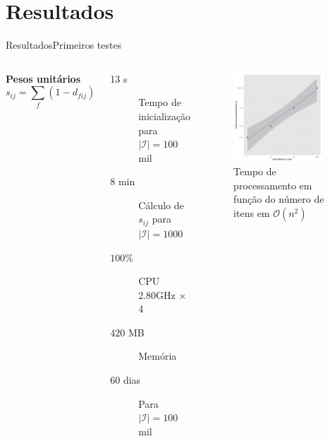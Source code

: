 \section[Resultados]{Resultados}

\begin{frame}{Resultados}{Primeiros testes}
\begin{columns}[c]
\textbf{Pesos unitários}
$$
    s_{ij} = \sum_{f}{\left(1-d_{fij}\right)}
$$
\begin{description}
	\item[13 s] Tempo de inicialização para $\left|\mathcal{I}\right| = 100$ mil
	\item[8 min] Cálculo de $s_{ij}$ para $\left|\mathcal{I}\right| = 1000$
	\item[$100 \%$] CPU \\ 2.80GHz $\times$ 4
	\item[$420$ MB] Memória 
	\item[]
	\item[60 dias] Para $\left|\mathcal{I}\right| = 100$  mil
\end{description}	
\begin{figure}[ht]
    \begin{center}
    \includegraphics[width=0.9\textwidth]{img/ixt}
    \end{center}
\caption{Tempo de processamento em função do número de itens em $\mathcal{O}\left(n^2\right)$}
\end{figure}
\end{columns}
\end{frame}


